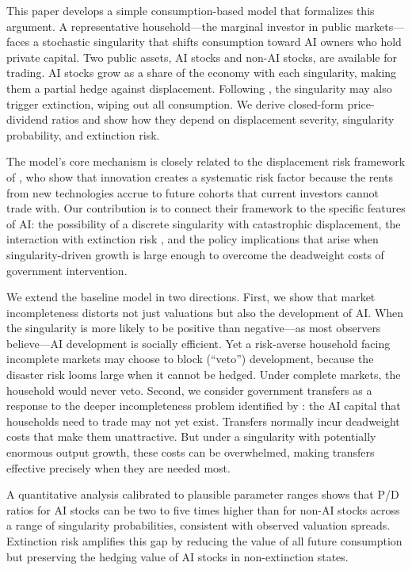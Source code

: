 \documentclass[12pt]{article}
\begin{document}
This paper develops a simple consumption-based model that formalizes this argument. A representative household---the marginal investor in public markets---faces a stochastic singularity that shifts consumption toward AI owners who hold private capital. Two public assets, AI stocks and non-AI stocks, are available for trading. AI stocks grow as a share of the economy with each singularity, making them a partial hedge against displacement. Following \citet{Jones2024}, the singularity may also trigger extinction, wiping out all consumption. We derive closed-form price-dividend ratios and show how they depend on displacement severity, singularity probability, and extinction risk.

The model's core mechanism is closely related to the displacement risk framework of \citet{GKP2012}, who show that innovation creates a systematic risk factor because the rents from new technologies accrue to future cohorts that current investors cannot trade with. Our contribution is to connect their framework to the specific features of AI: the possibility of a discrete singularity with catastrophic displacement, the interaction with extinction risk \citep{Jones2024}, and the policy implications that arise when singularity-driven growth is large enough to overcome the deadweight costs of government intervention.

We extend the baseline model in two directions. First, we show that market incompleteness distorts not just valuations but also the development of AI. When the singularity is more likely to be positive than negative---as most observers believe---AI development is socially efficient. Yet a risk-averse household facing incomplete markets may choose to block (``veto'') development, because the disaster risk looms large when it cannot be hedged. Under complete markets, the household would never veto. Second, we consider government transfers as a response to the deeper incompleteness problem identified by \citet{GKP2012}: the AI capital that households need to trade may not yet exist. Transfers normally incur deadweight costs that make them unattractive. But under a singularity with potentially enormous output growth, these costs can be overwhelmed, making transfers effective precisely when they are needed most.

A quantitative analysis calibrated to plausible parameter ranges shows that P/D ratios for AI stocks can be two to five times higher than for non-AI stocks across a range of singularity probabilities, consistent with observed valuation spreads. Extinction risk amplifies this gap by reducing the value of all future consumption but preserving the hedging value of AI stocks in non-extinction states.
\end{document}
